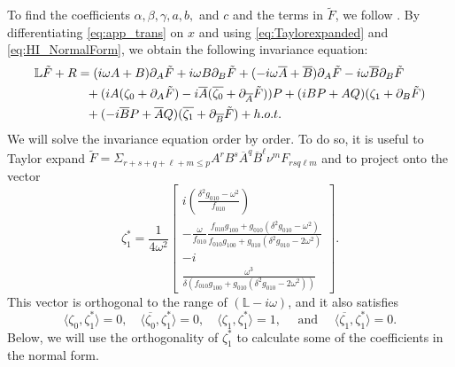\documentclass[11pt]{article}
\numberwithin{equation}{section}
\begin{document}
To find the coefficients $\alpha, \beta, \gamma, a, b, $ and $c$
and the terms in $\tilde{F}$, we follow \cite{HI2011}.
By differentiating \eqref{eq:app_trans} on $x$ and using \eqref{eq:Taylorexpanded} and \eqref{eq:HI_NormalForm}, we obtain the following invariance equation:
\begin{equation}
\begin{split} 
\mathbb{L} \tilde {F} + R &= (i \omega A + B) \partial_A \tilde{F} + i \omega B \partial_B \tilde{F} +( -i \omega \overline{A} +\overline{B})\partial_{A} \tilde{F} - i \omega \overline{B} \partial_{B} \tilde{F} \\
&{\hskip0.1truein} +( i A ( \zeta_0 + \partial_A \tilde{F} ) -i \overline{A} (\overline{\zeta_0} + \partial_{\overline A}\tilde{F})) P
+( i BP + AQ)( \zeta_1 + \partial_B \tilde{F})\\
&{\hskip0.1truein} + (-i \overline{B} P+ \overline{A} Q)( \overline{\zeta_1} +\partial_{\overline B} \tilde{F}) + h.o.t.
\end{split}
\end{equation}
We will solve the invariance equation order by order.
To do so, it is useful to Taylor expand
$\tilde{F} = \Sigma_{r+s+q+\ell+m \le p} A^r B^s \overline{A}^q \overline{B}^\ell \nu^m F_{rsq\ell m}$ and to project onto the vector
\begin{equation}
\zeta_1^* =
\frac {1}{4 \omega^2}
\left[
\begin{array}{c}
i \left( \frac{\delta^2 g_{010} - \omega^2}{f_{010}} \right) \\
-\frac{\omega}{f_{010}}\frac{f_{010}g_{100} +g_{010}(\delta^2 g_{010} - \omega^2)}
{f_{010}g_{100} + g_{010}( \delta^2 g_{010} - 2 \omega^2)} \\
-i \\
\frac{\omega^3}{\delta(f_{010}g_{100} +g_{010}(\delta^2g_{010} -2\omega^2))}
\end{array}
\right].
\end{equation}
This vector is orthogonal to the range of $(\mathbb{L} - i \omega)$, and it also satisfies
%
\[ 
\langle \zeta_0, \zeta_1^* \rangle = 0, \quad 
\langle \overline{\zeta_0}, \zeta_1^* \rangle = 0, \quad 
\langle \zeta_1, \zeta_1^* \rangle = 1, \quad \text{ and } \quad 
\langle \overline{\zeta_1}, \zeta_1^* \rangle = 0.
\]
%
Below, we will use the orthogonality of $\zeta_1^*$ to calculate some of the coefficients in the normal form.
\end{document}
